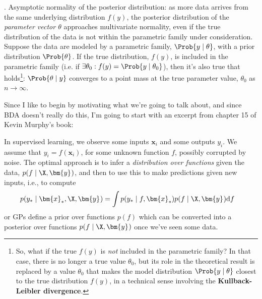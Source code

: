 \documentclass[11pt]{article}
\renewcommand\vec[2][]{\bm{#2}_{#1}}
\newcommand\myspace[1][]{\vspace{#1\bigskipamount}}
\newcommand\p{\Needspace{10\baselineskip} \noindent}
\begin{document}
\myspace
\p {}. Asymptotic normality of the posterior distribution: as more data arrives from the same underlying distribution $f(y)$, the posterior distribution of the \textit{parameter vector $\theta$} approaches multivariate normality, even if the true distribution of the data is not within the parametric family under consideration. \\

\p Suppose the data are modeled by a parametric family, $\Prob{y \mid \theta}$, with a prior distribution $\Prob{\theta}$. If the true distribution, $f(y)$, is included in the parametric family (i.e. if $\exists \theta_0: f(y) = \Prob{y \mid \theta_0}$), then it's also true that  holds\footnote{So, what if the true $f(y)$ is \textit{not} included in the parametric family? In that case, there is no longer a true value $\theta_0$, but its role in the theoretical result is replaced by a value $\theta_0$ that makes the model distribution $\Prob{y \mid \theta}$ closest to the true distribution $f(y)$, in a technical sense involving the \textbf{Kullback-Leibler divergence}.
}: $\Prob{\theta \mid y}$ converges to a point mass at the true parameter value, $\theta_0$ as $n \rightarrow \infty$.










Since I like to begin by motivating what we're going to talk about, and since BDA doesn't really do this, I'm going to start with an excerpt from chapter 15 of Kevin Murphy's book:
\begin{definition}
	In supervised learning, we observe some inputs $\vec[i]{x}$ and some outputs $y_i$. We assume that $y_i = f(\vec[i]{x})$, for some unknown function $f$, possibly corrupted by noise. The optimal approach is to infer a \textit{distribution over functions} given the data, $p(f \mid \X, \vec y)$, and then to use this to make predictions given new inputs, i.e., to compute
	\begin{align}
		p(y_* \mid \vec[*]{x}, \X, \vec y) 
			&= \int p(y_* \mid f, \vec[*]{x}) p(f \mid \X, \vec y) \mathrm{d}f
	\end{align}
	 or GPs define a prior over functions $p(f)$ which can be converted into a posterior over functions $p(f \mid \X, \vec y)$ once we've seen some data.
\end{definition}
\end{document}
